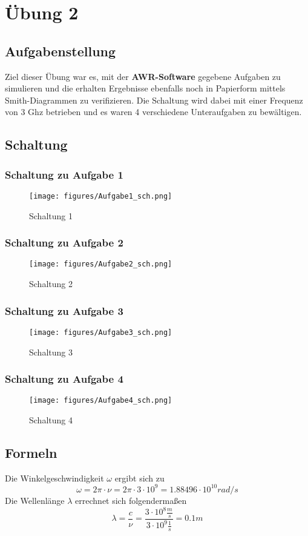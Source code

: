 \documentclass[12pt,a4paper,ngerman]{article}
\begin{document}
\section{Übung 2}
\subsection{Aufgabenstellung}
Ziel dieser Übung war es, mit der \textbf{AWR-Software} gegebene Aufgaben zu simulieren und die erhalten Ergebnisse ebenfalls noch in Papierform mittels Smith-Diagrammen zu verifizieren. Die Schaltung wird dabei mit einer Frequenz von 3 Ghz betrieben und es waren 4 verschiedene Unteraufgaben zu bewältigen. 
\subsection{Schaltung}
\subsubsection{Schaltung zu Aufgabe 1}
\begin{figure}[h!]
\centering
\texttt{[image: figures/Aufgabe1\_sch.png]} 
\caption{Schaltung 1}
\end{figure}
\subsubsection{Schaltung zu Aufgabe 2}
\begin{figure}[h!]
\centering
\texttt{[image: figures/Aufgabe2\_sch.png]} 
\caption{Schaltung 2}
\end{figure}
\pagebreak
\subsubsection{Schaltung zu Aufgabe 3}
\begin{figure}[h!]
\centering
\texttt{[image: figures/Aufgabe3\_sch.png]} 
\caption{Schaltung 3}
\end{figure}
\subsubsection{Schaltung zu Aufgabe 4}
\begin{figure}[h!]
\centering
\texttt{[image: figures/Aufgabe4\_sch.png]} 
\caption{Schaltung 4}
\end{figure}


\pagebreak

\subsection{Formeln}
Die Winkelgeschwindigkeit $\omega$ ergibt sich zu
\begin{equation}
\omega = 2 \pi \cdot \nu = 2 \pi \cdot 3 \cdot 10^9 = 1.88496 \cdot 10^{10} rad/s
\end{equation}
Die Wellenlänge $\lambda$ errechnet sich folgendermaßen
\begin{equation}
\lambda = \frac{c}{\nu} = \frac{3 \cdot 10^8\frac{m}{s}}{3 \cdot 10^9 \frac{1}{s}} = 0.1m
\end{equation}
\end{document}
